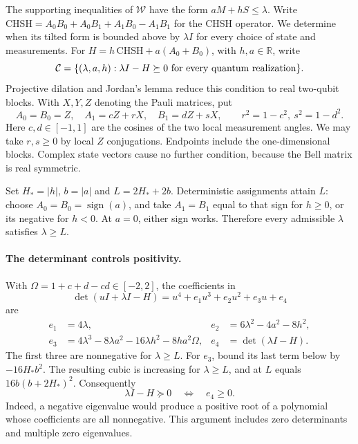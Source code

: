 \documentclass[11pt]{article}
\theoremstyle{remark}\newtheorem{remark}[theorem]{Remark}
\newcommand{\W}{\mathcal W}\newcommand{\sxdeg}{\operatorname{sxdeg}}
\begin{document}
The supporting inequalities of $\W$ have the form $aM+hS\le\lambda$.
Write $\mathrm{CHSH}=A_0B_0+A_0B_1+A_1B_0-A_1B_1$ for the CHSH
operator. We determine when its tilted form is bounded above by $\lambda I$
for every choice of state and measurements.
For \(H=h\,\mathrm{CHSH}+a(A_0+B_0)\), with \(h,a\in\mathbb R\), write
\[
 {\cal C}=\{(\lambda,a,h):\lambda I-H\succeq0
 \text{ for every quantum realization}\}.
\]
Projective dilation and Jordan's lemma reduce this condition to real
two-qubit blocks. With $X,Y,Z$ denoting the Pauli matrices, put
\[
 A_0=B_0=Z,\quad A_1=cZ+rX,\quad B_1=dZ+sX,\qquad
 r^2=1-c^2,\ s^2=1-d^2 .
\]
Here $c,d\in[-1,1]$ are the cosines of the two local measurement angles.
We may take \(r,s\ge0\) by local \(Z\) conjugations. Endpoints include the
one-dimensional blocks. Complex state vectors cause no further condition,
because the Bell matrix is real symmetric.

Set \(H_*=|h|\), \(b=|a|\) and \(L=2H_*+2b\).
Deterministic assignments attain \(L\): choose \(A_0=B_0=\operatorname{sign}(a)\),
and take \(A_1=B_1\) equal to that sign for \(h\ge0\), or its negative for \(h<0\).
At \(a=0\), either sign works. Therefore every admissible \(\lambda\) satisfies
\(\lambda\ge L\).

\paragraph{The determinant controls positivity.}
With \(\Omega=1+c+d-cd\in[-2,2]\), the coefficients in
\[
 \det(uI+\lambda I-H)=u^4+e_1u^3+e_2u^2+e_3u+e_4
\]
are
\begin{align*}
 e_1&=4\lambda,&
 e_2&=6\lambda^2-4a^2-8h^2,\\
 e_3&=4\lambda^3-8\lambda a^2-16\lambda h^2-8ha^2\Omega,
 &e_4&=\det(\lambda I-H).
\end{align*}
The first three are nonnegative for \(\lambda\ge L\).
For \(e_3\), bound its last term below by \(-16H_*b^2\).
The resulting cubic is increasing for \(\lambda\ge L\), and at \(L\) equals
\(16b(b+2H_*)^2\).
Consequently
\[
 \lambda I-H\succeq0\quad\Longleftrightarrow\quad e_4\ge0 .
\]
Indeed, a negative eigenvalue would produce a positive root of a polynomial
whose coefficients are all nonnegative. This argument includes zero determinants
and multiple zero eigenvalues.
\end{document}

